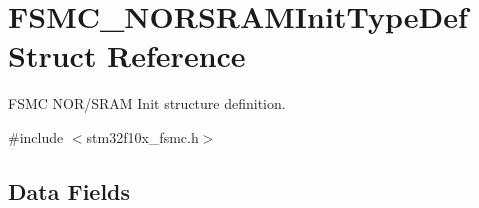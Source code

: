 \hypertarget{struct_f_s_m_c___n_o_r_s_r_a_m_init_type_def}{}\section{F\+S\+M\+C\+\_\+\+N\+O\+R\+S\+R\+A\+M\+Init\+Type\+Def Struct Reference}
\label{struct_f_s_m_c___n_o_r_s_r_a_m_init_type_def}


F\+S\+MC N\+O\+R/\+S\+R\+AM Init structure definition.  




{\ttfamily \#include $<$stm32f10x\+\_\+fsmc.\+h$>$}

\subsection*{Data Fields}
